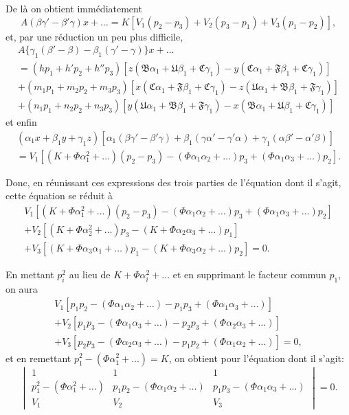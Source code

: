 \documentclass[12pt,a4paper]{article}
\theoremstyle{definition}
\begin{document}
De l\`{a} on obtient imm\'{e}diatement
\[
A(\beta\gamma' - \beta'\gamma)x + \ldots = K[V_1(p_2 - p_3) + V_2(p_3 - p_1) + V_3(p_1 - p_2)],
\]
et, par une r\'{e}duction un peu plus difficile,
\begin{multline*}
A\{\gamma_1(\beta' - \beta) - \beta_1(\gamma' - \gamma)\}x + \ldots \\
= (hp_1 + h'p_2 + h''p_3)[z(\mathfrak{B}\alpha_1 + \mathfrak{U}\beta_1 + \mathfrak{C}\gamma_1) - y(\mathfrak{C}\alpha_1 + \mathfrak{F}\beta_1 + \mathfrak{C}\gamma_1)] \\
+ (m_1 p_1 + m_2 p_2 + m_3 p_3)[x(\mathfrak{C}\alpha_1 + \mathfrak{F}\beta_1 + \mathfrak{C}\gamma_1) - z(\mathfrak{U}\alpha_1 + \mathfrak{B}\beta_1 + \mathfrak{F}\gamma_1)] \\
+ (n_1 p_1 + n_2 p_2 + n_3 p_3)[y(\mathfrak{U}\alpha_1 + \mathfrak{B}\beta_1 + \mathfrak{F}\gamma_1) - x(\mathfrak{B}\alpha_1 + \mathfrak{U}\beta_1 + \mathfrak{C}\gamma_1)]
\end{multline*}
et enfin
\begin{multline*}
(\alpha_1 x + \beta_1 y + \gamma_1 z)[\alpha_1(\beta\gamma' - \beta'\gamma) + \beta_1(\gamma\alpha' - \gamma'\alpha) + \gamma_1(\alpha\beta' - \alpha'\beta)] \\
= V_1[(K + \Phi\alpha_1^2 + \ldots)(p_2 - p_3) - (\Phi\alpha_1\alpha_2 + \ldots)p_3 + (\Phi\alpha_1\alpha_3 + \ldots)p_2].
\end{multline*}

Donc, en r\'{e}unissant ces expressions des trois parties de l'\'{e}quation dont il s'agit, cette \'{e}quation se r\'{e}duit \`{a}
\begin{multline}\tag{24}
V_1[(K + \Phi\alpha_1^2 + \ldots)(p_2 - p_3) - (\Phi\alpha_1\alpha_2 + \ldots)p_3 + (\Phi\alpha_1\alpha_3 + \ldots)p_2] \\
+ V_2[(K + \Phi\alpha_2^2 + \ldots)p_3 - (K + \Phi\alpha_2\alpha_3 + \ldots)p_1] \\
+ V_3[(K + \Phi\alpha_3\alpha_1 + \ldots)p_1 - (K + \Phi\alpha_3\alpha_2 + \ldots)p_2] = 0.
\end{multline}

En mettant $p_i^2$ au lieu de $K + \Phi\alpha_i^2 + \ldots$ et en supprimant le facteur commun $p_1$, on aura
\begin{multline*}
V_1[p_1 p_2 - (\Phi\alpha_1\alpha_2 + \ldots) - p_1 p_3 + (\Phi\alpha_1\alpha_3 + \ldots)] \\
+ V_2[p_1 p_3 - (\Phi\alpha_1\alpha_3 + \ldots) - p_2 p_3 + (\Phi\alpha_2\alpha_3 + \ldots)] \\
+ V_3[p_2 p_3 - (\Phi\alpha_2\alpha_3 + \ldots) - p_1 p_2 + (\Phi\alpha_1\alpha_2 + \ldots)] = 0,
\end{multline*}
et en remettant $p_1^2 - (\Phi\alpha_1^2 + \ldots) = K$, on obtient pour l'\'{e}quation dont il s'agit:
\begin{equation}\tag{25}
\begin{vmatrix}
1 & 1 & 1 \\
p_1^2 - (\Phi\alpha_1^2 + \ldots) & p_1 p_2 - (\Phi\alpha_1\alpha_2 + \ldots) & p_1 p_3 - (\Phi\alpha_1\alpha_3 + \ldots) \\
V_1 & V_2 & V_3
\end{vmatrix} = 0.
\end{equation}
\end{document}
